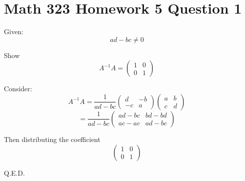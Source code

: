 \documentclass{article}
\author{Justin Steinberg}
\date{October 2021}
\begin{document}
\section{Math 323 Homework 5 Question 1}
Given: 
\begin{equation}
    ad-bc  \neq  0 
\end{equation}

Show
\begin{equation}
A^{-1}A =   \begin{pmatrix}
1 & 0 \\
0 & 1
\end{pmatrix}
\end{equation}

Consider:
\begin{equation}
A^{-1}A =  \frac{1}{ad-bc}  \begin{pmatrix}
d & -b \\
-c & a
\end{pmatrix} \begin{pmatrix}
a & b \\
c & d
\end{pmatrix}
\end{equation}
\begin{equation}
 = \frac{1}{ad-bc} \begin{pmatrix}
ad - bc & bd - bd \\
ac - ac & ad - bc
\end{pmatrix}
\end{equation}

Then distributing the coefficient
\begin{equation}
    \begin{pmatrix}
1 & 0 \\
0 & 1
\end{pmatrix}
\end{equation}

Q.E.D.
\end{document}
